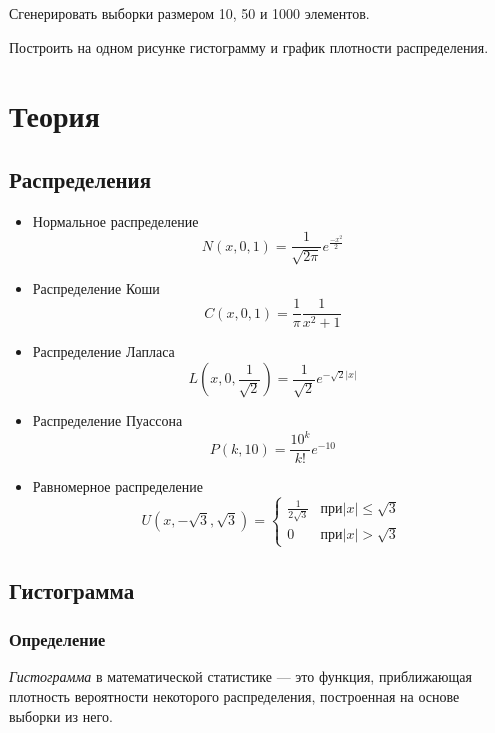 \documentclass[a4paper]{article}
\begin{document}
\noindent Сгенерировать выборки размером 10, 50 и 1000 элементов.
 
\noindent Построить на одном рисунке гистограмму и график плотности распределения.

\section {Теория}

\subsection{Распределения}
	\begin{itemize}
		\item Нормальное распределение \begin{equation}
										  N(x, 0, 1) = \frac{1}{\sqrt{2\pi}}e^{\frac{-x^2}{2}} \label{norm} 
									   \end{equation}
		\item Распределение Коши \begin{equation}
									C(x, 0, 1) = \frac{1}{\pi}\frac{1}{x^2+1} \label{koshi}
								 \end{equation} 
		\item Распределение Лапласа \begin{equation}
									   L(x, 0, \frac{1}{\sqrt{2}}) = \frac{1}{\sqrt{2}}e^{-\sqrt{2}|x|} \label{laplace} 
									\end{equation}
		\item Распределение Пуассона \begin{equation}
										P(k, 10) = \frac{10^k}{k!}e^{-10}\label{puasson}
									 \end{equation}
		\item Равномерное распределение \begin{equation}
				U(x, -\sqrt{3}, \sqrt{3}) =
				\begin{cases}
					\frac{1}{2\sqrt{3}} &\text{$при |x|\leq \sqrt{3}$}\\
					0 &\text{$при |x|>\sqrt{3}$}
				\end{cases}
				\label{uni} 
			\end{equation}
	\end{itemize}

	\subsection{Гистограмма}
	\subsubsection{Определение}
	 \textit{Гистограмма} в математической статистике — это функция, приближающая плотность вероятности некоторого распределения, построенная на основе выборки из него.
	
\end{document}
